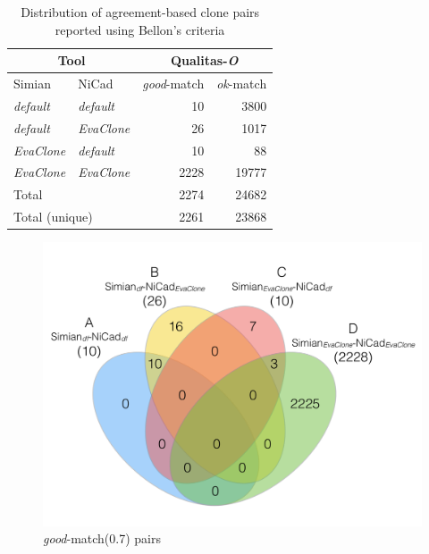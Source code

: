 \documentclass{sig-alternate-05-2015}
\begin{document}
\begin{table}[H]
	\centering
	\caption{Distribution of agreement-based clone pairs reported using Bellon's criteria}
	\label{t_agreed_good_clone_pairs}
	\small
	\begin{tabular}{l|l|r|r}
		\hline
		\multicolumn{2}{c|}{Tool} & \multicolumn{2}{c}{Qualitas-\textit{O}} \\
		\hline
		Simian & NiCad & \textit{good}-match & \textit{ok}-match \\
		\hline
		\textit{default} & \textit{default} & 10 	& 3800 \\ 
		\textit{default} & \textit{EvaClone} 	& 26 	& 1017 \\ 
		\textit{EvaClone} 	& \textit{default} 	& 10 	& 88 \\
		\textit{EvaClone} 	& \textit{EvaClone} 	& 2228 & 19777 \\ 
		\hline
		\multicolumn{2}{l|}{Total} & 2274 & 24682 \\
		\hline
		\multicolumn{2}{l|}{Total (unique)} & 2261 & 23868 \\
		\hline
	\end{tabular}
\end{table}

\begin{figure}
		\centering
		\includegraphics[width=0.9\linewidth]{venn4_pairs_good_pt1+2}
		\caption{\textit{good}-match(0.7) pairs}
		\label{fig:venn4_orig_good}
\end{figure}
\end{document}
